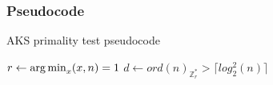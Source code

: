 \subsubsection{Pseudocode}
\begin{algorithm}
    \caption{AKS primality test pseudocode}\label{alg:aks_pscd_ptest}
    \label{step_1_aks}
    $r \gets \operatorname*{arg\,min}_{x} (x,n) = 1$\;
    $d \gets ord(n)_{\mathbb{Z}_{r}^{*}} > \lceil log_{2}^{2}(n) \rceil$\;\label{step_2_aks}
    \label{step_3_aks}
    \label{step_4_aks}
    \label{step_5_aks}
    \;\label{step_6_aks}
\end{algorithm}

